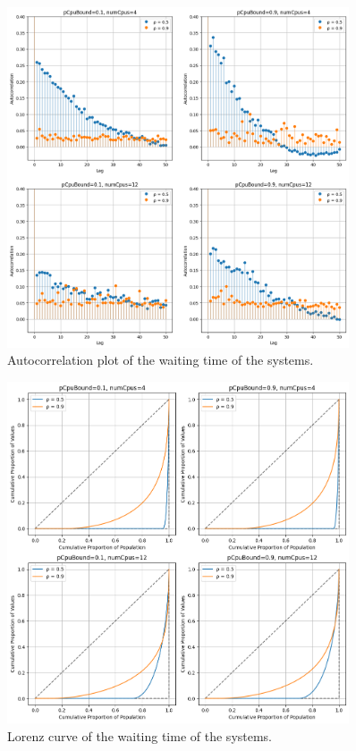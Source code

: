 \begin{figure}[H]
    \captionsetup{type=figure}
    \centering
    \includegraphics[width=0.9\textwidth]{./images/04/sjf/wait/autocorrelation.png}
    \caption{Autocorrelation plot of the waiting time of the systems.}
    \label{fig:sjfWaitAutocorrelation}
\end{figure}

\begin{figure}[H]
    \captionsetup{type=figure}
    \centering
    \includegraphics[width=0.9\textwidth]{./images/04/sjf/wait/lorenz.png}
    \caption{Lorenz curve of the waiting time of the systems.}
    \label{fig:sjfWaitLorenz}
\end{figure}


